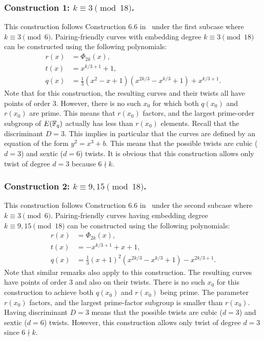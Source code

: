 \subsubsection{Construction 1: $k \equiv 3 \pmod{18}$.}
\label{con1}

This construction follows {Construction 6.6} in~\cite{2010/freeman}
under the first subcase where $k \equiv 3 \pmod{6}$.
Pairing-friendly curves with embedding degree $k \equiv 3 \pmod{18}$
can be constructed using the following polynomials:
\begin{align*}
r(x) &= \Phi_{2k}(x),	\\
t(x) &= x^{k/3+1} + 1,	\\
q(x) &= \frac{1}{3} (x^2 - x + 1) (x^{2k/3} - x^{k/3} + 1) + x^{k/3+1}.
\end{align*}
Note that for this construction,
the resulting curves and their twists all have points of order 3.
However, there is no such $x_0$ for which
both $q(x_0)$ and $r(x_0)$ are prime.
This means that $r(x_0)$ factors, and the largest prime-order subgroup of $E(\mathbb{F}_{q})$ actually has less than $r(x_0)$ elements.
Recall that the discriminant $D = 3$. 
This implies in particular that the curves are defined by an equation of the form $y^2 = x^3 + b$.
This means that the possible twists are cubic ($d=3$) and sextic ($d=6$) twists.
It is obvious that this construction allows only twist of degree $d = 3$ because $6 \nmid k$.


\subsubsection{Construction 2: $k \equiv 9,15 \pmod{18}$.}
\label{con2}

This construction follows {Construction 6.6} in~\cite{2010/freeman}
under the second subcase where $k \equiv 3 \pmod{6}$.
Pairing-friendly curves having embedding degree $k \equiv 9,15 \pmod{18}$
can be constructed using the following polynomials:
\begin{align*}
r(x) &= \Phi_{2k}(x),	\\
t(x) &= -x^{k/3+1} + x + 1,	\\
q(x) &= \frac{1}{3} (x+1)^2 (x^{2k/3} - x^{k/3} + 1) - x^{2k/3+1}.
\end{align*}
Note that similar remarks also apply to this construction.
The resulting curves have points of order 3 and also on their twists.
There is no such $x_0$ for this construction to achieve both $q(x_0)$ and $r(x_0)$ being prime.
The parameter  $r(x_0)$ factors, and the largest prime-factor subgroup is smaller than $r(x_0)$.
Having discriminant $D = 3$
means that the possible twists are  cubic ($d=3$) and sextic ($d=6$) twists.
However, this construction allows only twist of degree $d = 3$ since $6 \nmid k$.

